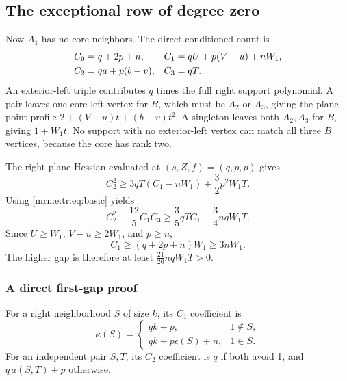 \documentclass[11pt,a4paper]{article}
\theoremstyle{remark}\newtheorem{remark}[theorem]{Remark}
\begin{document}
\subsection{The exceptional row of degree zero}
Now $A_1$ has no core neighbors. The direct conditioned count is
\begin{align}
 C_0&=q+2p+n,&
 C_1&=qU+p(V-u)+nW_1,\label{mrn:e:tr:eq:zero}\\
 C_2&=qa+p(b-v),&
 C_3&=qT.\notag
\end{align}
An exterior-left triple contributes $q$ times the full right support polynomial. A pair leaves one core-left vertex for $B$, which must be $A_2$ or $A_3$, giving the plane-point profile $2+(V-u)t+(b-v)t^2$. A singleton leaves both $A_2,A_3$ for $B$, giving $1+W_1t$. No support with no exterior-left vertex can match all three $B$ vertices, because the core has rank two.

The right plane Hessian evaluated at $(s,Z,f)=(q,p,p)$ gives
\[
 C_2^2\ge3qT(C_1-nW_1)+\frac32p^2W_1T.
\]
Using \eqref{mrn:e:tr:eq:basic} yields
\[
 C_2^2-\frac{12}{5}C_1C_3
 \ge\frac35qTC_1-\frac34nqW_1T.
\]
Since $U\ge W_1$, $V-u\ge2W_1$, and $p\ge n$,
\[
 C_1\ge(q+2p+n)W_1\ge3nW_1.
\]
The higher gap is therefore at least $\frac{21}{20}nqW_1T>0$.

\subsubsection{A direct first-gap proof}
For a right neighborhood $S$ of size $k$, its $C_1$ coefficient is
\[
 \kappa(S)=
 \begin{cases}
 qk+p,&1\notin S,\\
 qk+p\epsilon(S)+n,&1\in S.
 \end{cases}
\]
For an independent pair $S,T$, its $C_2$ coefficient is $q$ if both avoid 1, and $q\,a(S,T)+p$ otherwise.
\end{document}
